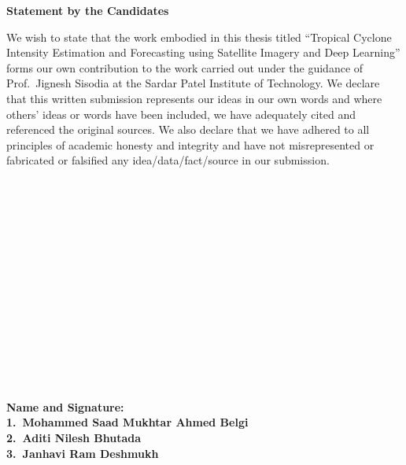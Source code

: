 \newpage
\thispagestyle{empty}
\vspace*{0.2cm}
\vspace{1cm}
\begin{center}
 \large\textbf{Statement by the Candidates}
\end{center}
\vspace{2cm}
We wish to state that the work embodied in this thesis titled ``Tropical Cyclone Intensity Estimation and Forecasting using Satellite Imagery and Deep Learning'' forms our own contribution to the work carried out under the guidance of Prof.\ Jignesh Sisodia at the Sardar Patel Institute of Technology. We declare that this written submission represents our ideas in our own words and where others' ideas or words have been included, we have adequately cited and referenced the original sources. We also declare that we have adhered to all principles of academic honesty and integrity and have not misrepresented or fabricated or falsified any idea/data/fact/source in our submission.
\\
\\
\\
\\
\\
\\
\\
\\
\\ 
\\
\\
\\
\\
\\
\\
\\
\textbf {Name and Signature:}\\
\textbf {1.\ Mohammed Saad Mukhtar Ahmed Belgi}\\
\textbf {2.\ Aditi Nilesh Bhutada}\\
\textbf {3.\ Janhavi Ram Deshmukh}\\
\newpage

